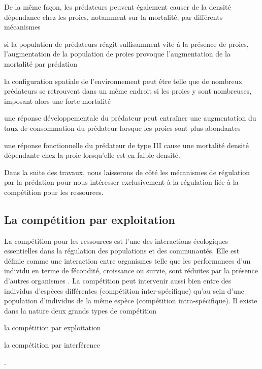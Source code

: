 De la même façon, les prédateurs peuvent également causer de la densité
dépendance chez les proies, notamment sur la mortalité, par différents
mécanismes \autocites{taylor1984a} 
\begin{enumerate*}[label=(\roman*),
before=\unskip{ : }, itemjoin={{ ; }}, itemjoin*={{ ; et }}] 
\item si la
population de prédateurs réagit suffisamment vite à la présence de proies,
l'augmentation de la population de proies provoque l'augmentation de la
mortalité par prédation 
\item la configuration spatiale de l'environnement peut être telle
que de nombreux prédateurs se retrouvent dans un même endroit si les proies y
sont nombreuses, imposant alors une forte mortalité 
\item une réponse
développementale du prédateur peut entraîner une augmentation du taux de
consommation du prédateur lorsque les proies sont plus abondantes 
\item une réponse fonctionnelle du prédateur de type III
\autocites{holling1965a} cause une mortalité densité dépendante chez la proie lorsqu'elle est en faible
densité.
\end{enumerate*}

Dans la suite des travaux, nous laisserons de côté les mécanismes de régulation
par la prédation pour nous intéresser exclusivement à la régulation liée à la
compétition pour les ressources. 

\subsection{La compétition par exploitation}

La compétition pour les ressources est l'une des interactions écologiques
essentielles dans la régulation des populations et des communautés. Elle est définie comme une
interaction entre organismes telle que les performances d'un individu en terme
de fécondité, croissance ou survie, sont réduites par la présence d'autres
organismes \autocites{volterra1931a, gause1932a, park1948a, park1954a,
park1957a}.
La compétition peut intervenir aussi bien entre des individus d'espèces
différentes (compétition inter-spécifique) qu'au sein d'une population
d'individus de la même espèce (compétition intra-spécifique). 
Il existe dans la nature deux grands types de compétition
\begin{enumerate*}[label=(\roman*), before=\unskip{ : }, itemjoin={{ ; }},
itemjoin*={{ ; et }}] \item la compétition par exploitation \item la compétition
par interférence \end{enumerate*} \autocites{park1954a, park1962a, begon2009a}.

